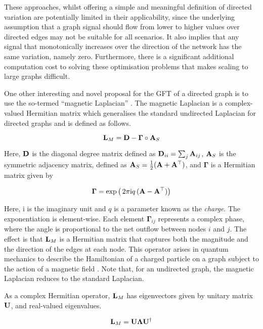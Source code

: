 These approaches, whilst offering a simple and meaningful definition of directed variation are potentially limited in their applicability, since the underlying assumption that a graph signal should flow from lower to higher values over directed edges may not be suitable for all scenarios. It also implies that any signal that monotonically increases over the direction of the network has the same variation, namely zero. Furthermore, there is a significant additional computation cost to solving these optimisation problems that makes scaling to large graphs difficult. 

One other interesting and novel proposal for the GFT of a directed graph is to use the so-termed ``magnetic Laplacian'' \citep{DeResende2020,Zhang2021}. The magnetic Laplacian is a complex-valued Hermitian matrix which generalises the standard undirected Laplacian for directed graphs and is defined as follows. 

\begin{equation}
    \mathbf{L}_M = \mathbf{D} - \boldsymbol{\Gamma} \circ \mathbf{A}_S
\end{equation}

Here, $\mathbf{D}$ is the diagonal degree matrix defined as $\mathbf{D}_{ii} = \sum_{j} \mathbf{A}_{ij}$, $\mathbf{A}_S$ is the symmetric adjacency matrix, defined as $\mathbf{A}_S = \frac{1}{2} (\mathbf{A} + \mathbf{A}^\top)$, and $\boldsymbol{\Gamma}$ is a Hermitian matrix given by 

\begin{equation}
    \boldsymbol{\Gamma} = \exp\big( \,2 \pi \text{i} q \, (\mathbf{A} - \mathbf{A}^\top)\big)
\end{equation}

Here, i is the imaginary unit and $q$ is a parameter known as the \textit{charge}. The exponentiation is element-wise. Each element $\boldsymbol{\Gamma}_{ij}$ represents a complex phase, where the angle is proportional to the net outflow between nodes $i$ and $j$. The effect is that $\mathbf{L}_M$ is a Hermitian matrix that captures both the magnitude and the direction of the edges at each node. This operator arises in quantum mechanics to describe the Hamiltonian of a charged particle on a graph subject to the action of a magnetic field \citep{Shubin1994}. Note that, for an undirected graph, the magnetic Laplacian reduces to the standard Laplacian. 

As a complex Hermitian operator, $\mathbf{L}_M$ has eigenvectors given by unitary matrix $\mathbf{U}$, and real-valued eigenvalues. 

\begin{equation}
    \mathbf{L}_M = \mathbf{U} \mathbf{\Lambda} \mathbf{U}^\dagger
\end{equation}

